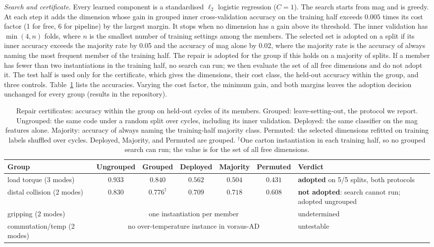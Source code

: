 \documentclass{ifacconf}
\begin{document}
\emph{Search and certificate.} Every learned component is a standardised
$\ell_2$ logistic regression ($C = 1$). The search starts from mag and is
greedy. At each step it adds the dimension whose gain in grouped inner
cross-validation accuracy on the training half exceeds $0.005$ times its cost
factor (1 for free, 6 for pipeline) by the largest margin. It stops when no
dimension has a gain above its threshold. The inner validation has $\min(4, n)$
folds, where $n$ is the smallest number of training settings among the members.
The selected set is adopted on a split if its inner accuracy exceeds the
majority rate by 0.05 and the accuracy of mag alone by 0.02, where the majority
rate is the accuracy of always naming the most frequent member of the training
half. The repair is adopted for the group if this holds on a majority of splits.
If a member has fewer than two instantiations in the training half, no search
can run; we then evaluate the set of all free dimensions and do not adopt it.
The test half is used only for the certificate, which gives the dimensions,
their cost class, the held-out accuracy within the group, and three controls.
Table~\ref{tab:cert} lists the accuracies. Varying the cost factor, the minimum
gain, and both margins leaves the adoption decision unchanged for every group
(results in the repository).

\begin{table}[t]
\centering
\caption{Repair certificates: accuracy within the group on held-out cycles of
its members. Grouped: leave-setting-out, the protocol we report. Ungrouped: the
same code under a random split over cycles, including its inner validation.
Deployed: the same classifier on the mag features alone. Majority: accuracy of
always naming the training-half majority class. Permuted: the selected
dimensions refitted on training labels shuffled over cycles. Deployed, Majority,
and Permuted are grouped. $^{\dag}$One carton instantiation in each training
half, so no grouped search can run; the value is for the set of all free
dimensions.}
\label{tab:cert}
\small\setlength{\tabcolsep}{4pt}
\begin{tabular}{lccccc>{\raggedright\arraybackslash}p{46mm}}
\toprule
Group & Ungrouped & Grouped & Deployed & Majority & Permuted & Verdict \\
\midrule
load torque (3 modes)      & $0.933$ & $0.840$ & $0.562$ & $0.504$ & $0.431$ &
  \textbf{adopted} on 5/5 splits, both protocols \\
distal collision (2 modes) & $0.830$ & $0.776^{\dag}$ & $0.709$ & $0.718$ & $0.608$ &
  \textbf{not adopted}: search cannot run; adopted ungrouped \\
gripping (2 modes)         & \multicolumn{5}{c}{one instantiation per member} &
  undetermined \\
commutation/temp (2 modes) & \multicolumn{5}{c}{no over-temperature instance in voraus-AD} &
  untestable \\
\bottomrule
\end{tabular}
\end{table}
\end{document}

